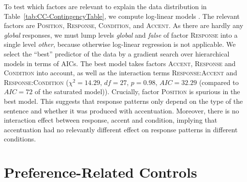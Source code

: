 \documentclass[fleqn,reqno,10pt]{article}
\begin{document}
To test which factors are relevant to explain the data distribution in
Table~\ref{tab:CC-ContingencyTable}, we compute log-linear models
\citep{KnokeBurke1980:Log-Linear-Mode}. The relevant factors are
\textsc{Position}, \textsc{Response}, \textsc{Condition}, and
\textsc{Accent}. As there are hardly any \emph{global} responses, we
must lump levels \emph{global} and \emph{false} of factor
\textsc{Response} into a single level \emph{other}, because otherwise
log-linear regression is not applicable. We select the ``best''
predictor of the data by a gradient search over hierarchical models in
terms of AICs. The best model takes factors \textsc{Accent},
\textsc{Response} and \textsc{Condition} into account, as well as the
interaction terms \textsc{Response:Accent} and
\textsc{Response:Condition} ($\chi^2 = 14.29$, $df=27$, $p = 0.98$,
$AIC = 32.29$ (compared to $AIC=72$ of the saturated
model)). Crucially, factor \textsc{Position} is spurious in the best
model. This suggests that response patterns only depend on the type of
the sentence and whether it was produced with accentuation. Moreover,
there is no interaction effect between response, accent and condition,
implying that accentuation had no relevantly different effect on
response patterns in different conditions.





\section{Preference-Related Controls}
\label{sec:pref-relat-contr}
\end{document}
